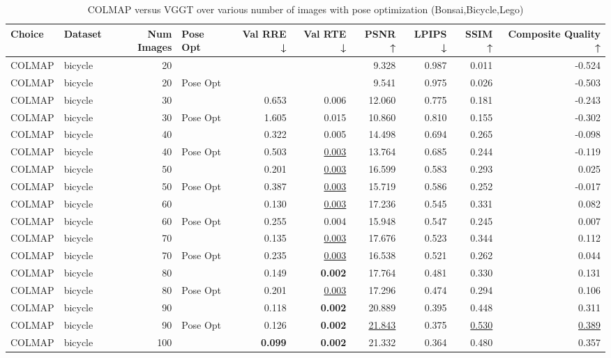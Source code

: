 \begin{table}[H]
\caption{COLMAP versus VGGT over various number of images with pose optimization (Bonsai,Bicycle,Lego)}
\label{tab:01_num_images_pose_opt_bonsai,bicycle,lego}
\small
\begin{tabular}{llrlrrrrrr}
\toprule
Choice & Dataset & Num Images & Pose Opt & Val RRE ↓ & Val RTE ↓ & PSNR ↑ & LPIPS ↓ & SSIM ↑ & Composite Quality ↑ \\
\midrule
COLMAP & bicycle & 20 &  &  &  & 9.328 & 0.987 & 0.011 & -0.524 \\
COLMAP & bicycle & 20 & Pose Opt &  &  & 9.541 & 0.975 & 0.026 & -0.503 \\
COLMAP & bicycle & 30 &  & 0.653 & 0.006 & 12.060 & 0.775 & 0.181 & -0.243 \\
COLMAP & bicycle & 30 & Pose Opt & 1.605 & 0.015 & 10.860 & 0.810 & 0.155 & -0.302 \\
COLMAP & bicycle & 40 &  & 0.322 & 0.005 & 14.498 & 0.694 & 0.265 & -0.098 \\
COLMAP & bicycle & 40 & Pose Opt & 0.503 & \underline{0.003} & 13.764 & 0.685 & 0.244 & -0.119 \\
COLMAP & bicycle & 50 &  & 0.201 & \underline{0.003} & 16.599 & 0.583 & 0.293 & 0.025 \\
COLMAP & bicycle & 50 & Pose Opt & 0.387 & \underline{0.003} & 15.719 & 0.586 & 0.252 & -0.017 \\
COLMAP & bicycle & 60 &  & 0.130 & \underline{0.003} & 17.236 & 0.545 & 0.331 & 0.082 \\
COLMAP & bicycle & 60 & Pose Opt & 0.255 & 0.004 & 15.948 & 0.547 & 0.245 & 0.007 \\
COLMAP & bicycle & 70 &  & 0.135 & \underline{0.003} & 17.676 & 0.523 & 0.344 & 0.112 \\
COLMAP & bicycle & 70 & Pose Opt & 0.235 & \underline{0.003} & 16.538 & 0.521 & 0.262 & 0.044 \\
COLMAP & bicycle & 80 &  & 0.149 & \textbf{0.002} & 17.764 & 0.481 & 0.330 & 0.131 \\
COLMAP & bicycle & 80 & Pose Opt & 0.201 & \underline{0.003} & 17.296 & 0.474 & 0.294 & 0.106 \\
COLMAP & bicycle & 90 &  & 0.118 & \textbf{0.002} & 20.889 & 0.395 & 0.448 & 0.311 \\
COLMAP & bicycle & 90 & Pose Opt & 0.126 & \textbf{0.002} & \underline{21.843} & 0.375 & \underline{0.530} & \underline{0.389} \\
COLMAP & bicycle & 100 &  & \textbf{0.099} & \textbf{0.002} & 21.332 & 0.364 & 0.480 & 0.357 \\

\end{tabular}
\end{table}
